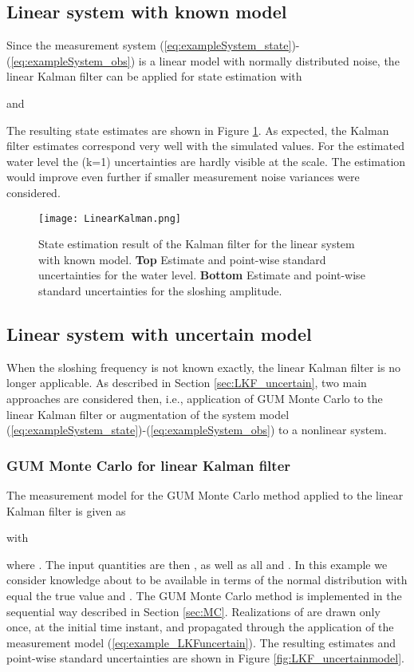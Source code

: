 \documentclass[10pt]{article}
\begin{document}
\begin{spacing}{1}
\subsection{Linear system with known model}

Since the measurement system (\ref{eq:exampleSystem_state})-(\ref{eq:exampleSystem_obs}) is a linear model with normally distributed noise, the linear Kalman filter can be applied for state estimation with

and

The resulting state estimates are shown in Figure \ref{fig:LKF_knownmodel}. As expected, the Kalman filter estimates correspond very well with the simulated values. For the estimated water level the (k=1) uncertainties are hardly visible at the scale. The estimation would improve even further if smaller measurement noise variances were considered.

\begin{figure}[h!]
	\centering
	\texttt{[image: LinearKalman.png]}
	\caption{State estimation result of the Kalman filter for the linear system with known model. \textbf{Top} Estimate and point-wise standard uncertainties for the water level. \textbf{Bottom} Estimate and point-wise standard uncertainties for the sloshing amplitude.}
\label{fig:LKF_knownmodel}
\end{figure}

\subsection{Linear system with uncertain model}
When the sloshing frequency  is not known exactly, the linear Kalman filter is no longer applicable. As described in Section \ref{sec:LKF_uncertain}, two main approaches are considered then, i.e., application of GUM Monte Carlo to the linear Kalman filter or augmentation of the system model (\ref{eq:exampleSystem_state})-(\ref{eq:exampleSystem_obs}) to a nonlinear system.
\subsubsection*{GUM Monte Carlo for linear Kalman filter}
The measurement model for the GUM Monte Carlo method applied to the linear Kalman filter is given as

with 

where . The input quantities are then ,  as well as all  and . In this example we consider knowledge about  to be available in terms of the normal distribution  with  equal the true value and . The GUM Monte Carlo method is implemented in the sequential way described in Section \ref{sec:MC}. Realizations of  are drawn only once, at the initial time instant, and propagated through the application of the measurement model (\ref{eq:example_LKFuncertain}). The resulting estimates and point-wise standard uncertainties are shown in Figure \ref{fig:LKF_uncertainmodel}.


\end{spacing}
\end{document}
